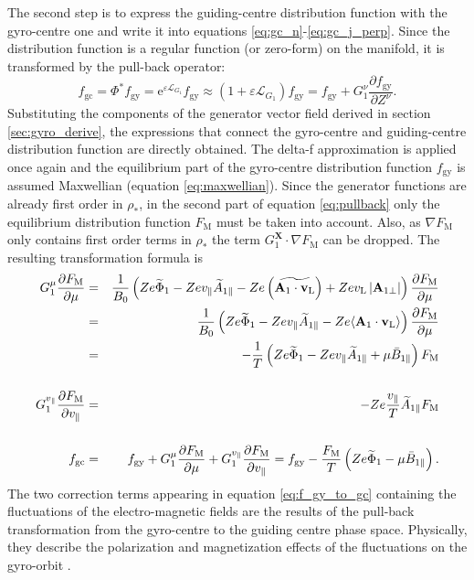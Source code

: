 \documentclass[a4paper,10pt]{article}
\newcommand{\st}[1]{\mathrm{#1}} %
\renewcommand{\vec}[1]{\mathbf{#1}}
\begin{document}
The second step is to express the guiding-centre distribution function with the gyro-centre one and write it into equations \ref{eq:gc_n}-\ref{eq:gc_j_perp}. Since the distribution function is a regular function (or zero-form) on the manifold, it is transformed by the pull-back operator:
\begin{equation}
	f_{\st{gc}} = \Phi^* f_{\st{gy}} = \mathrm{e}^{\varepsilon \mathcal{L}_{G_1}} f_{\st{gy}} \approx \left( 1 + \varepsilon \mathcal{L}_{G_1} \right) f_{\st{gy}} = f_{\st{gy}} + G_1^{\nu} \frac{\partial f_{\st{gy}}}{\partial Z^{\nu}}. \label{eq:pullback}
\end{equation}
Substituting the components of the generator vector field derived in section \ref{sec:gyro_derive}, the expressions that connect the gyro-centre and guiding-centre distribution function are directly obtained. The delta-f approximation is applied once again and the equilibrium part of the gyro-centre distribution function $f_{\st{gy}}$ is assumed Maxwellian (equation \ref{eq:maxwellian}). Since the generator functions are already first order in $\rho_*$, in the second part of equation \ref{eq:pullback} only the equilibrium distribution function $F_{\st{M}}$ must be taken into account. Also, as $\nabla F_{\st{M}}$ only contains first order terms in $\rho_*$ the term $G_1^{\mathbf{X}} \cdot \nabla F_{\st{M}}$ can be dropped. The resulting transformation formula is
\begin{eqnarray}
 	G_1^{\mu} \frac{\partial F_{\st{M}}}{\partial \mu} &=& \frac{1}{B_0} \left( Z e \widetilde{\Phi}_1 - Z e v_{\parallel} \widetilde{A}_{1 \parallel} - Z e \left( \widetilde{\mathbf{A}_1 \cdot \vec{v}_{\st{L}}} \right) + Z e v_{\st{L}} \left| \mathbf{A}_{1 \perp}\right| \right) \frac{\partial F_{\st{M}}}{\partial \mu} \nonumber \\
	&=& \frac{1}{B_0} \left( Z e \widetilde{\Phi}_1 - Z e v_{\parallel} \widetilde{A}_{1 \parallel} - Z e \langle \mathbf{A}_1 \cdot \vec{v}_{\st{L}} \rangle \right) \frac{\partial F_{\st{M}}}{\partial \mu} \nonumber \\
	&=& -\frac{1}{T} \left( Z e \widetilde{\Phi}_1 - Z e v_{\parallel} \widetilde{A}_{1 \parallel} + \mu \bar{B}_{1 \parallel} \right) F_{\st{M}} \nonumber \\
	\noalign{\vskip 0.5 truecm}
	G_1^{v_{\parallel}} \frac{\partial F_{\st{M}}}{\partial v_{\parallel}} &=& - Z e \frac{v_{\parallel}}{T} \widetilde{A}_{1 \parallel} F_{\st{M}} \nonumber \\
	\noalign{\vskip 0.5 truecm}
	f_{\st{gc}} &=& f_{\st{gy}} + G_1^{\mu} \frac{\partial F_{\st{M}}}{\partial \mu} + G_1^{v_{\parallel}} \frac{\partial F_{\st{M}}}{\partial v_{\parallel}} = f_{\st{gy}} - \frac{F_{\st{M}}}{T} \left( Z e \widetilde{\Phi}_1 - \mu \bar{B}_{1 \parallel} \right).
	\label{eq:f_gy_to_gc}
\end{eqnarray}
The two correction terms appearing in equation \ref{eq:f_gy_to_gc} containing the fluctuations of the electro-magnetic fields are the results of the pull-back transformation from the gyro-centre to the guiding centre phase space. Physically, they describe the polarization and magnetization effects of the fluctuations on the gyro-orbit \cite{brizard}. 
\end{document}
